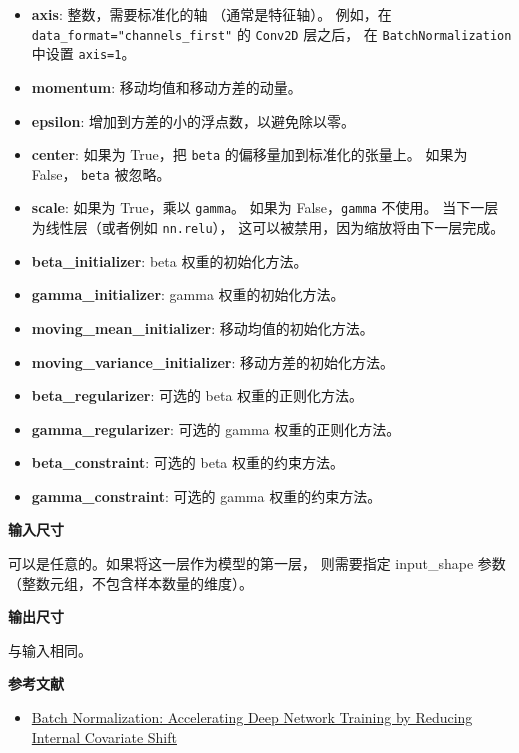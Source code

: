\begin{itemize}
\tightlist
\item
  \textbf{axis}: 整数，需要标准化的轴 （通常是特征轴）。 例如，在
  \texttt{data\_format="channels\_first"} 的 \texttt{Conv2D} 层之后， 在
  \texttt{BatchNormalization} 中设置 \texttt{axis=1}。
\item
  \textbf{momentum}: 移动均值和移动方差的动量。
\item
  \textbf{epsilon}: 增加到方差的小的浮点数，以避免除以零。
\item
  \textbf{center}: 如果为 True，把 \texttt{beta}
  的偏移量加到标准化的张量上。 如果为 False， \texttt{beta} 被忽略。
\item
  \textbf{scale}: 如果为 True，乘以 \texttt{gamma}。 如果为
  False，\texttt{gamma} 不使用。 当下一层为线性层（或者例如
  \texttt{nn.relu}）， 这可以被禁用，因为缩放将由下一层完成。
\item
  \textbf{beta\_initializer}: beta 权重的初始化方法。
\item
  \textbf{gamma\_initializer}: gamma 权重的初始化方法。
\item
  \textbf{moving\_mean\_initializer}: 移动均值的初始化方法。
\item
  \textbf{moving\_variance\_initializer}: 移动方差的初始化方法。
\item
  \textbf{beta\_regularizer}: 可选的 beta 权重的正则化方法。
\item
  \textbf{gamma\_regularizer}: 可选的 gamma 权重的正则化方法。
\item
  \textbf{beta\_constraint}: 可选的 beta 权重的约束方法。
\item
  \textbf{gamma\_constraint}: 可选的 gamma 权重的约束方法。
\end{itemize}

\textbf{输入尺寸}

可以是任意的。如果将这一层作为模型的第一层， 则需要指定 input\_shape
参数 （整数元组，不包含样本数量的维度）。

\textbf{输出尺寸}

与输入相同。

\textbf{参考文献}

\begin{itemize}
\tightlist
\item
  \href{https://arxiv.org/abs/1502.03167}{Batch Normalization:
  Accelerating Deep Network Training by Reducing Internal Covariate
  Shift}
\end{itemize}
\newpage
